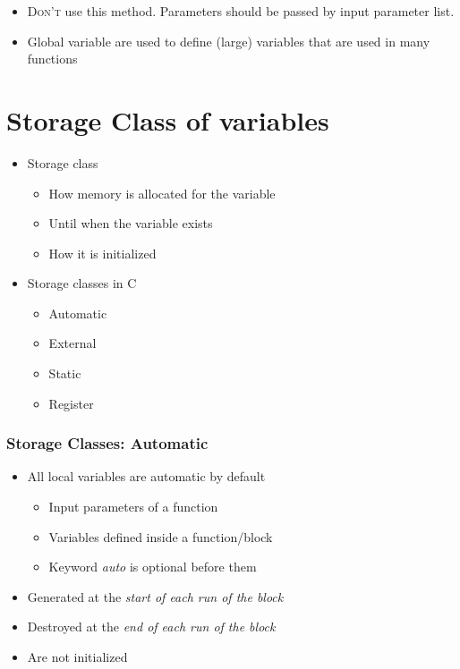 \documentclass{../c-lecture}
\begin{document}
\begin{frame}
  \begin{itemize}
    \item
      \textsc{\color{RubineRed} Don't} use this method. Parameters should be
      passed by input parameter list.
    \item
      Global variable are used to define (large) variables that are used in
      many functions
  \end{itemize}
\end{frame}

\section{Storage Class of variables}

\begin{frame}
  \begin{itemize}
    \item Storage class
    \begin{itemize}
      \item How memory is allocated for the variable
      \item Until when the variable exists
      \item How it is initialized
    \end{itemize}
    \item Storage classes in C
    \begin{itemize}
      \item Automatic
      \item External
      \item Static
      \item Register
    \end{itemize}
  \end{itemize}
\end{frame}

\begin{frame}
  \frametitle{Storage Classes: Automatic}
  \begin{itemize}
    \item All local variables are automatic by default
    \begin{itemize}
      \item Input parameters of a function
      \item Variables defined inside a function/block
      \item
        Keyword \textit{\color{YellowOrange} auto} is optional before them
    \end{itemize}
    \item
      Generated at the
      \textit{\color{LimeGreen} start of each run of the block}
    \item
      Destroyed at the
      \textit{\color{LimeGreen} end of each run of the block}
    \item Are not initialized
  \end{itemize}
\end{frame}
\end{document}
